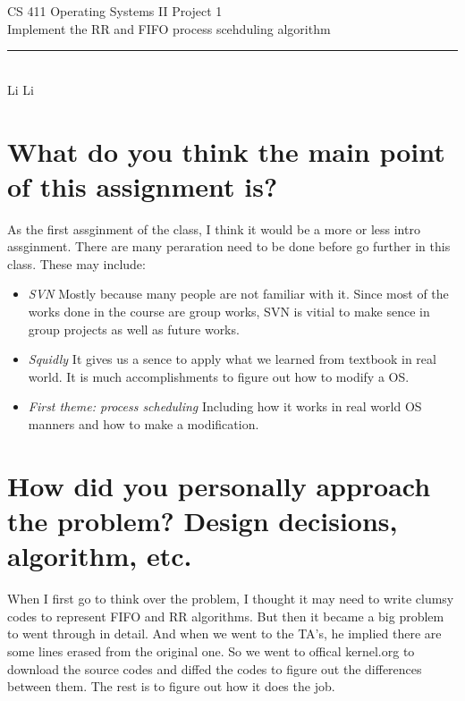 \documentclass[12pt,letterpaper]{article}
\begin{document}
\begin{titlepage}
    \vspace*{4cm}
    \begin{flushleft}
    {\huge
        CS 411 Operating Systems II Project 1\\[.5cm]
    }
    {\large
        Implement the RR and FIFO process scehduling algorithm
    }
    \end{flushleft}
    \vfill
    \rule{5in}{.5mm}\\
    Li Li

\end{titlepage}
\section{What do you think the main point of this assignment is?}
As the first assginment of the class, I think it would be a more or less intro assginment. There are many peraration need to be done before go further in this class. These may include:
\begin{itemize}
\item \emph{SVN}  Mostly because many people are not familiar with it. Since most of the works done in the course are group works, SVN is vitial to make sence in group projects as well as future works.
\item \emph{Squidly} It gives us a sence to apply what we learned from textbook in real world. It is much accomplishments to figure out how to modify a OS.
\item \emph{First theme: process scheduling }Including how it works in real world OS manners and how to make a modification.
\end{itemize}


\section{How did you personally approach the problem? Design decisions, algorithm, etc.}
When I first go to think over the problem, I thought it may need to write clumsy codes to represent FIFO and RR algorithms. But then it became a big problem to went through in detail. And when we went to the TA's, he implied there are some lines erased from the original one. So we went to offical kernel.org to download the source codes and diffed the codes to figure out the differences between them. The rest is to figure out how it does the job.
\end{document}
